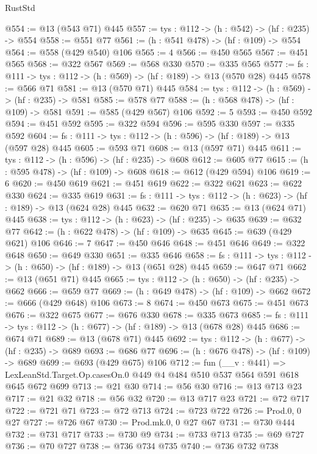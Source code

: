 \begin{lexlean}{RustStd}
\begin{coremodule}
@554 := @13 (@543 @71) @445
@557 := {tys : @112} -> (h : @542) -> (hf : @235) -> @554
@558 := @551 @77
@561 := (h : @541 @478) -> (hf : @109) -> @554
@564 := @558 (@429 @540) @106
@565 := 4
@566 := @450 @565
@567 := @451 @565
@568 := @322 @567
@569 := @568 @330
@570 := @335 @565
@577 := {fs : @111} -> {tys : @112} -> (h : @569) -> (hf : @189) -> @13 (@570 @28) @445
@578 := @566 @71
@581 := @13 (@570 @71) @445
@584 := {tys : @112} -> (h : @569) -> (hf : @235) -> @581
@585 := @578 @77
@588 := (h : @568 @478) -> (hf : @109) -> @581
@591 := @585 (@429 @567) @106
@592 := 5
@593 := @450 @592
@594 := @451 @592
@595 := @322 @594
@596 := @595 @330
@597 := @335 @592
@604 := {fs : @111} -> {tys : @112} -> (h : @596) -> (hf : @189) -> @13 (@597 @28) @445
@605 := @593 @71
@608 := @13 (@597 @71) @445
@611 := {tys : @112} -> (h : @596) -> (hf : @235) -> @608
@612 := @605 @77
@615 := (h : @595 @478) -> (hf : @109) -> @608
@618 := @612 (@429 @594) @106
@619 := 6
@620 := @450 @619
@621 := @451 @619
@622 := @322 @621
@623 := @622 @330
@624 := @335 @619
@631 := {fs : @111} -> {tys : @112} -> (h : @623) -> (hf : @189) -> @13 (@624 @28) @445
@632 := @620 @71
@635 := @13 (@624 @71) @445
@638 := {tys : @112} -> (h : @623) -> (hf : @235) -> @635
@639 := @632 @77
@642 := (h : @622 @478) -> (hf : @109) -> @635
@645 := @639 (@429 @621) @106
@646 := 7
@647 := @450 @646
@648 := @451 @646
@649 := @322 @648
@650 := @649 @330
@651 := @335 @646
@658 := {fs : @111} -> {tys : @112} -> (h : @650) -> (hf : @189) -> @13 (@651 @28) @445
@659 := @647 @71
@662 := @13 (@651 @71) @445
@665 := {tys : @112} -> (h : @650) -> (hf : @235) -> @662
@666 := @659 @77
@669 := (h : @649 @478) -> (hf : @109) -> @662
@672 := @666 (@429 @648) @106
@673 := 8
@674 := @450 @673
@675 := @451 @673
@676 := @322 @675
@677 := @676 @330
@678 := @335 @673
@685 := {fs : @111} -> {tys : @112} -> (h : @677) -> (hf : @189) -> @13 (@678 @28) @445
@686 := @674 @71
@689 := @13 (@678 @71) @445
@692 := {tys : @112} -> (h : @677) -> (hf : @235) -> @689
@693 := @686 @77
@696 := (h : @676 @478) -> (hf : @109) -> @689
@699 := @693 (@429 @675) @106
@712 := fun (__v : @441) =>
  LexLeanStd.Target.Op.casesOn.{0} @449 @4 @484 @510 @537 @564 @591 @618 @645 @672 @699
@713 := @21 @30
@714 := @56 @30
@716 := @13 @713 @23
@717 := @21 @32
@718 := @56 @32
@720 := @13 @717 @23
@721 := @72 @717
@722 := @721 @71
@723 := @72 @713
@724 := @723 @722
@726 := Prod.{0, 0} @27
@727 := @726 @67
@730 := Prod.mk.{0, 0} @27 @67
@731 := @730 @444
@732 := @731 @717
@733 := @730 @9
@734 := @733 @713
@735 := @69 @727
@736 := @70 @727
@738 := @736 @734 @735
@740 := @736 @732 @738

\end{coremodule}
\end{lexlean}
